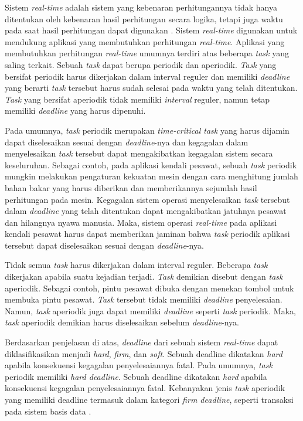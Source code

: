 Sistem \textit{real-time} adalah sistem yang kebenaran perhitungannya tidak hanya ditentukan
oleh kebenaran hasil perhitungan secara logika, tetapi juga waktu pada saat hasil perhitungan
dapat digunakan \citep[pp.~6-7]{Shin1994}.  Sistem \textit{real-time} digunakan untuk mendukung
aplikasi yang membutuhkan perhitungan \textit{real-time}.  Aplikasi yang membutuhkan perhitungan
\textit{real-time} umumnya terdiri atas beberapa \textit{task} yang saling terkait.  Sebuah
\textit{task} dapat berupa periodik dan aperiodik. \textit{Task} yang bersifat periodik harus
dikerjakan dalam interval reguler dan memiliki \textit{deadline} yang berarti \textit{task}
tersebut harus sudah selesai pada waktu yang telah ditentukan. \textit{Task} yang bersifat
aperiodik tidak memiliki \textit{interval} reguler, namun tetap memiliki \textit{deadline} yang
harus dipenuhi.

 Pada umumnya,
\textit{task} periodik merupakan \textit{time-critical task} yang harus dijamin dapat
diselesaikan sesuai dengan \textit{deadline}-nya dan kegagalan dalam menyelesaikan \textit{task}
tersebut dapat mengakibatkan kegagalan sistem secara keseluruhan.  Sebagai contoh, pada aplikasi
kendali pesawat, sebuah \textit{task} periodik mungkin melakukan pengaturan kekuatan mesin
dengan cara menghitung jumlah bahan bakar yang harus diberikan dan memberikannya sejumlah hasil
perhitungan pada mesin.  Kegagalan sistem operasi menyelesaikan \textit{task} tersebut dalam
\textit{deadline} yang telah ditentukan dapat mengakibatkan jatuhnya pesawat dan hilangnya nyawa
manusia.  Maka, sistem operasi \textit{real-time} pada aplikasi kendali pesawat harus dapat
memberikan jaminan bahwa \textit{task} periodik aplikasi tersebut dapat diselesaikan sesuai
dengan \textit{deadline}-nya.

Tidak semua \textit{task} harus dikerjakan dalam interval reguler. Beberapa \textit{task}
dikerjakan apabila suatu kejadian terjadi. \textit{Task} demikian disebut dengan \textit{task}
aperiodik.  Sebagai contoh, pintu pesawat dibuka dengan menekan tombol untuk membuka pintu
pesawat.  \textit{Task} tersebut tidak memiliki \textit{deadline} penyelesaian.  Namun,
\textit{task} aperiodik juga dapat memiliki \textit{deadline} seperti \textit{ task} periodik.
Maka, \textit{task} aperiodik demikian harus diselesaikan sebelum \textit{deadline}-nya.

Berdasarkan penjelasan di atas, \textit{deadline} dari sebuah sistem \textit{real-time} dapat
diklasifikasikan menjadi \textit{hard}, \textit{firm}, dan \textit{soft}.  Sebuah deadline
dikatakan \textit{hard} apabila konsekuensi kegagalan penyelesaiannya fatal.  Pada umumnya,
\textit{task} periodik memiliki \textit{hard deadline}.  Sebuah deadline dikatakan \textit{hard}
apabila konsekuensi kegagalan penyelesaiannya fatal.  Kebanyakan jenis \textit{task} aperiodik
yang memiliki deadline termasuk dalam kategori \textit{firm deadline}, seperti transaksi pada
sistem basis data \citep[pp.~203-241]{Haritsa1992}.

